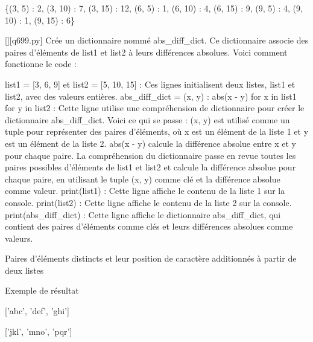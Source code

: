 \{(3, 5) : 2, (3, 10) : 7, (3, 15) : 12, (6, 5) : 1, (6, 10) : 4, (6, 15) : 9, (9, 5) : 4, (9, 10) : 1, (9, 15) : 6\}
        \par
        \begin{solution}
            \renewcommand{\nomfichier}{q699.py}
            \pythonfile{\chemincode \nomfichier}[][\nomfichier]
            Crée un dictionnaire nommé abs_diff_dict. Ce dictionnaire associe des paires d'éléments de list1 et list2 à leurs différences absolues. Voici comment fonctionne le code :

    list1 = [3, 6, 9] et list2 = [5, 10, 15] : Ces lignes initialisent deux listes, list1 et list2, avec des valeurs entières.
    abs_diff_dict = {(x, y) : abs(x - y) for x in list1 for y in list2} : Cette ligne utilise une compréhension de dictionnaire pour créer le dictionnaire abs_diff_dict. Voici ce qui se passe :
        (x, y) est utilisé comme un tuple pour représenter des paires d'éléments, où x est un élément de la liste 1 et y est un élément de la liste 2.
        abs(x - y) calcule la différence absolue entre x et y pour chaque paire.
        La compréhension du dictionnaire passe en revue toutes les paires possibles d'éléments de list1 et list2 et calcule la différence absolue pour chaque paire, en utilisant le tuple (x, y) comme clé et la différence absolue comme valeur.
    print(list1) : Cette ligne affiche le contenu de la liste 1 sur la console.
    print(list2) : Cette ligne affiche le contenu de la liste 2 sur la console.
    print(abs_diff_dict) : Cette ligne affiche le dictionnaire abs_diff_dict, qui contient des paires d'éléments comme clés et leurs différences absolues comme valeurs.
        \end{solution}
        

        \question
        Paires d'éléments distincts et leur position de caractère additionnés à partir de deux listes

Exemple de résultat

['abc', 'def', 'ghi']

['jkl', 'mno', 'pqr']

